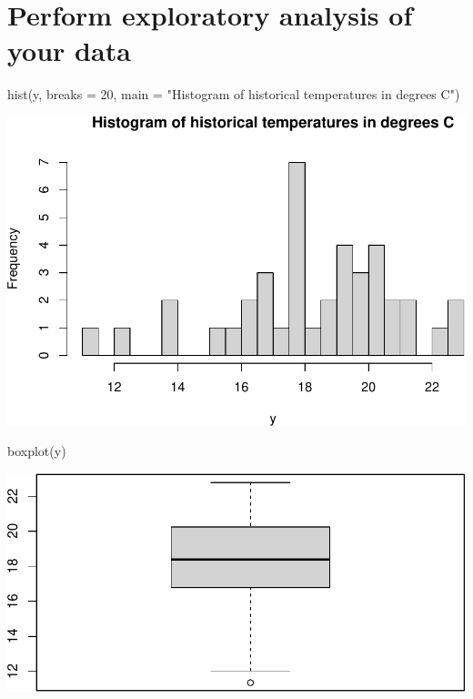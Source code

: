 \documentclass[
]{book}
\newenvironment{Shaded}{\begin{snugshade}}{\end{snugshade}}
\newcommand{\AttributeTok}[1]{\textcolor[rgb]{0.77,0.63,0.00}{#1}}
\newcommand{\DecValTok}[1]{\textcolor[rgb]{0.00,0.00,0.81}{#1}}
\newcommand{\FunctionTok}[1]{\textcolor[rgb]{0.00,0.00,0.00}{#1}}
\newcommand{\NormalTok}[1]{#1}
\newcommand{\StringTok}[1]{\textcolor[rgb]{0.31,0.60,0.02}{#1}}
\begin{document}
\hypertarget{perform-exploratory-analysis-of-your-data}{%
\section{Perform exploratory analysis of your data}\label{perform-exploratory-analysis-of-your-data}}

\begin{Shaded}
\begin{Highlighting}[]
\FunctionTok{hist}\NormalTok{(y, }\AttributeTok{breaks =} \DecValTok{20}\NormalTok{, }\AttributeTok{main =} \StringTok{"Histogram of historical temperatures in degrees C"}\NormalTok{)}
\end{Highlighting}
\end{Shaded}

\includegraphics{graphics/unnamed-chunk-3-1.pdf}

\begin{Shaded}
\begin{Highlighting}[]
\FunctionTok{boxplot}\NormalTok{(y)}
\end{Highlighting}
\end{Shaded}

\includegraphics{graphics/unnamed-chunk-4-1.pdf}
\end{document}
